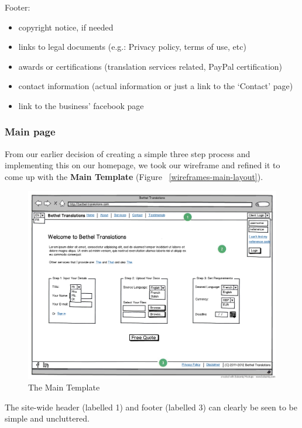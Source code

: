 \documentclass{l3proj}
\begin{document}
Footer:
\begin{itemize} \itemsep1pt \parskip0pt 
	\item copyright notice, if needed
	\item links to legal documents (e.g.: Privacy policy, terms of use, etc)
	\item awards or certifications (translation services related, 
	PayPal certification)
	\item contact information (actual information or just a link to the 
	`Contact’ page)
	\item link to the business’ facebook page
\end{itemize}


\subsubsection{Main page}
From our earlier decision of creating a simple three step process and
implementing this on our homepage, we took our wireframe and refined it to
come up with the  \textbf{Main Template} (Figure ~\ref{wireframes-main-layout}).

\begin{figure}[ht]
\label{wireframes:main-template}
\begin{center}
\includegraphics[width=\linewidth]{wireframes/bt-homepagev3}
\caption{The Main Template}
\end{center}
\end{figure}

The site-wide header (labelled 1) and footer (labelled 3) can clearly be seen to be simple and uncluttered.
\end{document}
